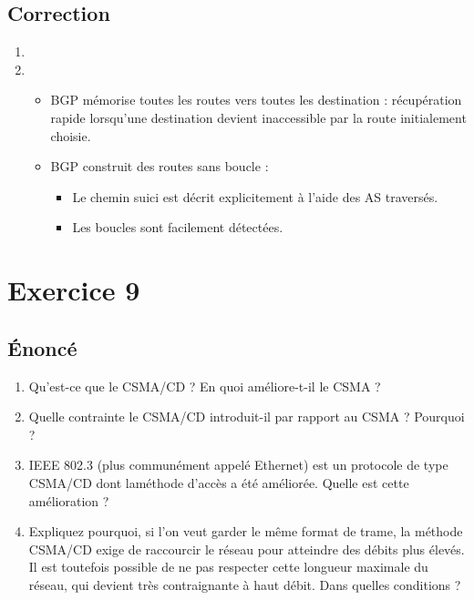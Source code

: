\documentclass[a4paper, 11pt, titlepage]{article}
\begin{document}
\subsection{Correction}
\begin{enumerate}[label=(\alph*)]
\item 

\item
\begin{itemize}
\item BGP mémorise toutes les routes vers toutes les destination : récupération rapide lorsqu'une destination devient inaccessible par la route initialement choisie.
\item BGP construit des routes sans boucle : \begin{itemize}
\item Le chemin suici est décrit explicitement à l'aide des AS traversés.
\item Les boucles sont facilement détectées.
\end{itemize}
\end{itemize}


\end{enumerate}



\section{Exercice 9}
\subsection{\'Enoncé}
\begin{enumerate}[label=(\alph*)]
  \item Qu’est-ce que le CSMA/CD ? En quoi améliore-t-il le CSMA ?
  \item Quelle contrainte le CSMA/CD introduit-il par rapport au CSMA ? Pourquoi ?
  \item IEEE 802.3 (plus communément appelé Ethernet) est un protocole de type CSMA/CD dont laméthode d'accès a été améliorée. Quelle est cette amélioration ?
  \item Expliquez pourquoi, si l’on veut garder le même format de trame, la méthode CSMA/CD exige de raccourcir le réseau pour atteindre des débits plus élevés. Il est toutefois possible de ne pas respecter cette longueur maximale du réseau, qui devient très contraignante à haut débit. Dans quelles conditions ?
\end{enumerate}
\end{document}
